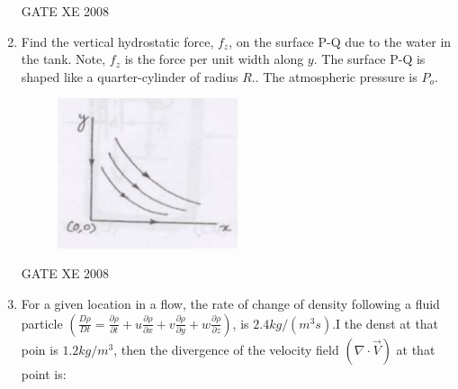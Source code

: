 \documentclass[12pt]{article}
\begin{document}
\begin{enumerate}
\begin{enumerate}
\end{enumerate}

GATE XE 2008
\item Find the vertical hydrostatic force, $f_{z}$, on the surface P-Q due to the water in the tank. Note, $f_{z}$ is the force per unit width along $y$. The surface P-Q is shaped like a quarter-cylinder of radius $R$.. The atmospheric pressure is $P_{o}$.

\begin{figure}[H]
\centering
  \includegraphics[width=0.5\textwidth]{figs/ass1_d_q12.png}
  \caption{}
\end{figure} 

\begin{enumerate}
\end{enumerate}

GATE XE 2008
\item For a given location in a flow, the rate of change of density following a fluid particle
$(\frac{D\rho}{Dt} = \frac{\partial \rho}{\partial t} + u\frac{\partial \rho}{\partial x} + v\frac{\partial \rho}{\partial y} + w\frac{\partial \rho}{\partial z})$, is $2.4 kg/(m^3 s)$.I the denst at that poin is $1.2 kg/m^3$, then
the divergence of the velocity field $(\nabla \cdot \vec{V})$ at that point is:


\end{enumerate}
\end{document}
